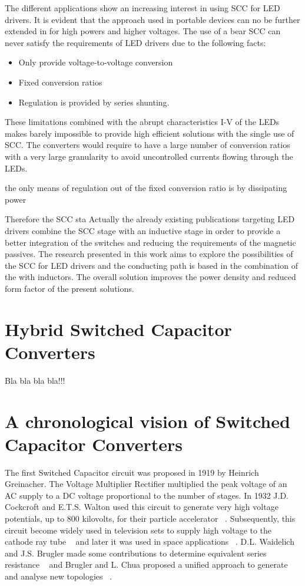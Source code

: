 The different applications show an increasing interest in using SCC for LED drivers. It is evident that the approach used in portable devices can no be further extended in for high powers and higher voltages. The use of a bear SCC can never satisfy the requirements of LED drivers due to the following facts:
\begin{itemize}
  \item Only provide voltage-to-voltage conversion
  \item Fixed conversion ratios
  \item Regulation is provided by series shunting.
\end{itemize}
These limitations combined with the abrupt characteristics I-V of the LEDs makes barely impossible to provide high efficient solutions with the single use of SCC. The converters would require to have a large number of conversion ratios with a very large granularity to avoid uncontrolled currents flowing through the LEDs.



the only means of regulation out of the fixed conversion ratio is by dissipating power


Therefore the SCC sta Actually the already existing publications targeting LED drivers combine the SCC stage with an inductive stage in order to provide a better integration of the switches and reducing the requirements of the magnetic passives. The research presented in this work aims to explore the possibilities of the SCC for LED drivers and the conducting path is based in the combination of the with inductors. The overall solution improves the power density and reduced form factor of the present solutions.


\section[H-SCC]{Hybrid Switched Capacitor Converters}

Bla bla bla bla!!!



\section[Chronological Vision of SCC]{A chronological vision of Switched Capacitor Converters}


The first Switched Capacitor circuit was proposed in 1919 by Heinrich Greinacher. The Voltage Multiplier Rectifier
multiplied the peak voltage of an AC supply to a DC voltage proportional to the number of stages.
In 1932 J.D. Cockcroft and E.T.S. Walton used this circuit to generate very high voltage potentials,
up to 800 kilovolts, for their particle accelerator ~\cite{30Cockcroft}. Subsequently, this circuit become widely used in
television sets to supply high voltage to the cathode ray tube ~\cite{70Buechel} and later it was used in space applications
~\cite{86Weinberg}. D.L. Waidelich and J.S. Brugler made some contributions to determine equivalent series resistance
~\cite{44Waidelich,71Brugler} and Brugler and L. Chua proposed a unified approach to generate and analyse new topologies
~\cite{71Brugler,77Lin}.



